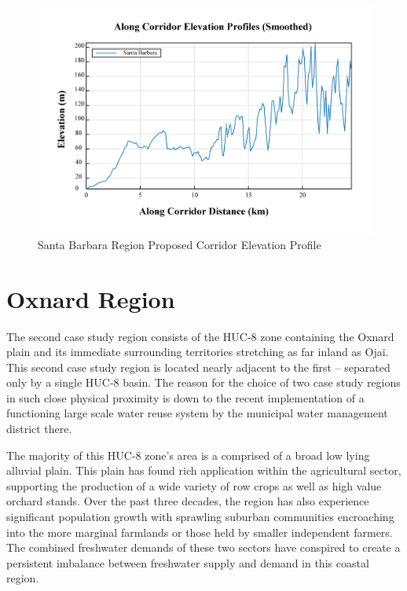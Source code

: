         \begin{figure}[!h]
            \begin{center}
            \includegraphics[width=5.5in]{figures/SantaBarbara_Elevation_Profile.png}   
            \caption{Santa Barbara Region Proposed Corridor Elevation Profile}
            \label{fig:SBelevationProfile}
            \end{center}
        \end{figure}
        
\clearpage
    
\section{Oxnard Region}

The second case study region consists of the HUC-8 zone containing the Oxnard plain and its immediate surrounding territories stretching as far inland as Ojai. This second case study region is located nearly adjacent to the first -- separated only by a single HUC-8 basin. The reason for the choice of two case study regions in such close physical proximity is down to the recent implementation of a functioning large scale water reuse system by the municipal water management district there. 

The majority of this HUC-8 zone's area is a comprised of a broad low lying alluvial plain. This plain has found rich application within the agricultural sector, supporting the production of a wide variety of row crops as well as high value orchard stands. Over the past three decades, the region has also experience significant population growth with sprawling suburban communities encroaching into the more marginal farmlands or those held by smaller independent farmers. The combined freshwater demands of these two sectors have conspired to create a persistent imbalance between freshwater supply and demand in this coastal region. 

